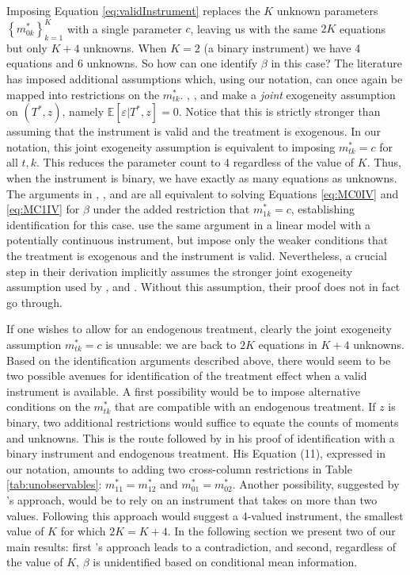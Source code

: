 Imposing Equation \ref{eq:validInstrument} replaces the $K$ unknown parameters $\left\{ m^*_{0k}\right\}_{k=1}^K $ with a single parameter $c$, leaving us with the same $2K$ equations but only $K+4$ unknowns.
When $K=2$ (a binary instrument) we have 4 equations and 6 unknowns.
So how can one identify $\beta$ in this case?
The literature has imposed additional assumptions which, using our notation, can once again be mapped into restrictions on the $m_{tk}^*$.
\cite{BBS}, \cite{KRS}, and \cite{Mahajan} make a \emph{joint} exogeneity assumption on $(T^*,z)$, namely $\mathbb{E}[\varepsilon|T^*,z]=0$.
Notice that this is strictly stronger than assuming that the instrument is valid and the treatment is exogenous.
In our notation, this joint exogeneity assumption is equivalent to imposing $m_{tk}^*=c$ for all $t,k$.
This reduces the parameter count to 4 regardless of the value of $K$.
Thus, when the instrument is binary, we have exactly as many equations as unknowns.
The arguments in \cite{BBS}, \cite{KRS}, and \cite{Mahajan} are all equivalent to solving Equations \ref{eq:MC0IV} and \ref{eq:MC1IV} for $\beta$ under the added restriction that $m^*_{1k}=c$, establishing identification for this case.
\cite{FL} use the same argument in a linear model with a potentially continuous instrument, but impose only the weaker conditions that the treatment is exogenous and the instrument is valid. 
Nevertheless, a crucial step in their derivation implicitly assumes the stronger joint exogeneity assumption used by \cite{BBS}, \cite{KRS} and \cite{Mahajan}.
Without this assumption, their proof does not in fact go through.

If one wishes to allow for an endogenous treatment, clearly the joint exogeneity assumption $m_{tk}^*=c$ is unusable: we are back to $2K$ equations in $K+4$ unknowns.
Based on the identification arguments described above, there would seem to be two possible avenues for identification of the treatment effect when a valid instrument is available.
A first possibility would be to impose alternative conditions on the $m^*_{tk}$ that are compatible with an endogenous treatment.
If $z$ is binary, two additional restrictions would suffice to equate the counts of moments and unknowns.
This is the route followed by \cite{Mahajan} in his proof of identification with a binary instrument and endogenous treatment.
His Equation (11), expressed in our notation, amounts to adding two cross-column restrictions in Table \ref{tab:unobservables}: $m^*_{11} = m^*_{12}$ and $m^*_{01} = m^*_{02}$. 
Another possibility, suggested by \citeauthor{Lewbel}'s approach, would be to rely on an instrument that takes on more than two values.
Following this approach would suggest a 4-valued instrument, the smallest value of $K$ for which $2K = K+4$.
In the following section we present two of our main results: first \citeauthor{Mahajan}'s approach leads to a contradiction, and second, regardless of the value of $K$, $\beta$ is unidentified based on conditional mean information.



